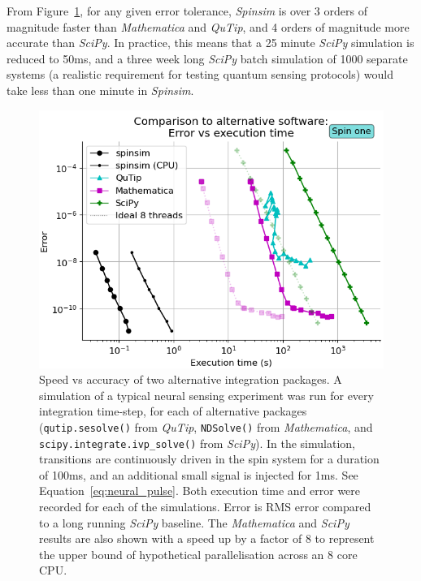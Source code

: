 \documentclass{jors}
\begin{document}
		From Figure~\ref{fig:benchmark_external}, for any given error tolerance, \emph{Spinsim} is over 3 orders of magnitude faster than \emph{Mathematica} and \emph{QuTip}, and 4 orders of magnitude more accurate than \emph{SciPy}.
		In practice, this means that a 25 minute \emph{SciPy} simulation is reduced to 50ms, and a three week long \emph{SciPy} batch simulation of 1000 separate systems (a realistic requirement for testing quantum sensing protocols) would take less than one minute in \emph{Spinsim}.
		\begin{figure}[h!]
			\centering
			\includegraphics[scale=0.475]{benchmark_external_execution_error.png} %
			\caption{Speed vs accuracy of two alternative integration packages.
			A simulation of a typical neural sensing experiment was run for every integration time-step, for each of alternative packages (\texttt{qutip.sesolve()} from \emph{QuTip}, \texttt{NDSolve()} from \emph{Mathematica}, and \texttt{scipy.integrate.ivp\_solve()} from \emph{SciPy}).
			In the simulation, transitions are continuously driven in the spin system for a duration of 100ms, and an additional small signal is injected for 1ms.
			See Equation~\eqref{eq:neural_pulse}.
			Both execution time and error were recorded for each of the simulations.
			Error is RMS error compared to a long running \emph{SciPy} baseline.
			The \emph{Mathematica} and \emph{SciPy} results are also shown with a speed up by a factor of 8 to represent the upper bound of hypothetical parallelisation across an 8 core CPU.}
			\label{fig:benchmark_external}
		\end{figure}
\end{document}
